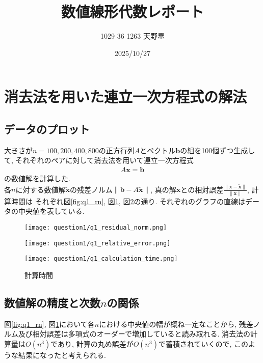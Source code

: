 \documentclass[uplatex,a4j]{jsarticle}
\title{数値線形代数レポート}
\author{1029 36 1263 天野塁}
\date{2025/10/27}
\begin{document}
\maketitle

\section{消去法を用いた連立一次方程式の解法}
\label{sec:q1}

\subsection{データのプロット}
\label{sec:q1_1}

大きさが$n = 100,200,400,800$の正方行列$A$とベクトル$\bm{b}$の組を100個ずつ生成して, 
それぞれのペアに対して消去法を用いて連立一次方程式
\begin{align}
  A \bm{x} = \bm{b}
\end{align}
の数値解を計算した. \\
各$n$に対する数値解$\bm{\tilde{x}}$の残差ノルム$\| \bm{b} - A \bm{\tilde{x}} \|$, 
真の解$\bm{x}$との相対誤差$\frac{\| \bm{x} - \bm{\tilde{x}} \|}{\| \bm{x} \|}$, 計算時間は
それぞれ図\ref{fig:q1_rn}, 図\ref{fig:q1_re}, 図\ref{fig:q1_ct}の通り. 
それぞれのグラフの直線はデータの中央値を表している.

\begin{figure}[htbp]
  \centering

  \begin{minipage}[t]{0.48\textwidth}
    \centering
    \texttt{[image: question1/q1\_residual\_norm.png]}
    \label{fig:q1_rn}
  \end{minipage}
  \hfill
  \begin{minipage}[t]{0.48\textwidth}
    \centering
    \texttt{[image: question1/q1\_relative\_error.png]}
    \label{fig:q1_re}
  \end{minipage}
  
\end{figure}

\begin{figure}[ht]
  \centering
  \texttt{[image: question1/q1\_calculation\_time.png]}
  \caption{計算時間}
  \label{fig:q1_ct}
\end{figure}

\newpage
\subsection{数値解の精度と次数$n$の関係}
\label{sec:q1_2}
図\ref{fig:q1_rn}, 図\ref{fig:q1_re}において各$n$における中央値の幅が概ね一定なことから, 
残差ノルム及び相対誤差は多項式のオーダーで増加していると読み取れる. 
消去法の計算量は$O(n^3)$であり, 計算の丸め誤差が$O(n^3)$で蓄積されていくので, このような結果になったと考えられる.
\end{document}
